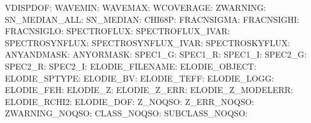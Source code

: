 VDISPDOF:  \newline 
WAVEMIN:  \newline 
WAVEMAX:  \newline 
WCOVERAGE:  \newline 
ZWARNING:  \newline 
SN\_MEDIAN\_ALL:  \newline 
SN\_MEDIAN:  \newline 
CHI68P:  \newline 
FRACNSIGMA:  \newline 
FRACNSIGHI:  \newline 
FRACNSIGLO:  \newline 
SPECTROFLUX:  \newline 
SPECTROFLUX\_IVAR:  \newline 
SPECTROSYNFLUX:  \newline 
SPECTROSYNFLUX\_IVAR:  \newline 
SPECTROSKYFLUX:  \newline 
ANYANDMASK:  \newline 
ANYORMASK:  \newline 
SPEC1\_G:  \newline 
SPEC1\_R:  \newline 
SPEC1\_I:  \newline 
SPEC2\_G:  \newline 
SPEC2\_R:  \newline 
SPEC2\_I:  \newline 
ELODIE\_FILENAME:  \newline 
ELODIE\_OBJECT:  \newline 
ELODIE\_SPTYPE:  \newline 
ELODIE\_BV:  \newline 
ELODIE\_TEFF:  \newline 
ELODIE\_LOGG:  \newline 
ELODIE\_FEH:  \newline 
ELODIE\_Z:  \newline 
ELODIE\_Z\_ERR:  \newline 
ELODIE\_Z\_MODELERR:  \newline 
ELODIE\_RCHI2:  \newline 
ELODIE\_DOF:  \newline 
Z\_NOQSO:  \newline 
Z\_ERR\_NOQSO:  \newline 
ZWARNING\_NOQSO:  \newline 
CLASS\_NOQSO:  \newline 
SUBCLASS\_NOQSO:  \newline 
